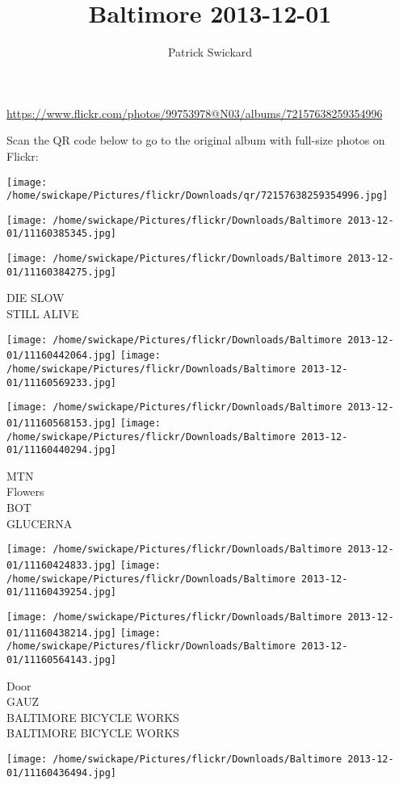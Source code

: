 \documentclass[10pt,letterpaper]{article}
\title{Baltimore 2013-12-01}
\author{Patrick Swickard}
\date{}
\begin{document}
\maketitle

\url{https://www.flickr.com/photos/99753978@N03/albums/72157638259354996}

Scan the QR code below to go to the original album with full-size photos on Flickr:

\texttt{[image: /home/swickape/Pictures/flickr/Downloads/qr/72157638259354996.jpg]}
\pagebreak

\texttt{[image: /home/swickape/Pictures/flickr/Downloads/Baltimore 2013-12-01/11160385345.jpg]}

\vspace{0.25in}
\texttt{[image: /home/swickape/Pictures/flickr/Downloads/Baltimore 2013-12-01/11160384275.jpg]}

DIE SLOW\\
STILL ALIVE
\pagebreak

\texttt{[image: /home/swickape/Pictures/flickr/Downloads/Baltimore 2013-12-01/11160442064.jpg]}
\texttt{[image: /home/swickape/Pictures/flickr/Downloads/Baltimore 2013-12-01/11160569233.jpg]}

\texttt{[image: /home/swickape/Pictures/flickr/Downloads/Baltimore 2013-12-01/11160568153.jpg]}
\texttt{[image: /home/swickape/Pictures/flickr/Downloads/Baltimore 2013-12-01/11160440294.jpg]}

MTN\\
Flowers\\
BOT\\
GLUCERNA
\pagebreak

\texttt{[image: /home/swickape/Pictures/flickr/Downloads/Baltimore 2013-12-01/11160424833.jpg]}
\texttt{[image: /home/swickape/Pictures/flickr/Downloads/Baltimore 2013-12-01/11160439254.jpg]}

\texttt{[image: /home/swickape/Pictures/flickr/Downloads/Baltimore 2013-12-01/11160438214.jpg]}
\texttt{[image: /home/swickape/Pictures/flickr/Downloads/Baltimore 2013-12-01/11160564143.jpg]}

Door\\
GAUZ\\
BALTIMORE BICYCLE WORKS\\
BALTIMORE BICYCLE WORKS
\pagebreak

\texttt{[image: /home/swickape/Pictures/flickr/Downloads/Baltimore 2013-12-01/11160436494.jpg]}
\end{document}
